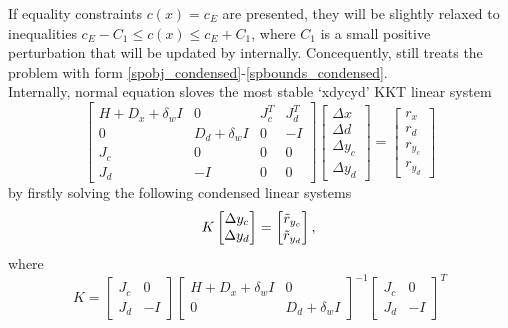  If equality constraints $c(x)=c_E$ are presented, they will be slightly relaxed to inequalities $c_E - C_1\leq c(x)\leq c_E+C_1$, where $C_1$ is a small positive perturbation that will be updated by \Hi internally. Concequently, \Hi still treats the problem with form \eqref{spobj_condensed}-\eqref{spbounds_condensed}.\\

Internally, normal equation sloves the most stable `xdycyd' KKT linear system 
\begin{equation} \label{KKT_xdycyd_normaleqn}
  \begin{bmatrix}
    H+D_x+\delta_{w}I & 0 & J_c^T & J_d^T\\
    0  & D_d + \delta_{w}I &  0    &  -I\\
    J_c & 0 & 0 & 0\\
    J_d & -I & 0 & 0
  \end{bmatrix}
  \begin{bmatrix} \Delta x \\ \Delta d \\ \Delta y_c \\ \Delta y_d  \end{bmatrix} = 
  \begin{bmatrix} r_x \\ r_d \\ r_{y_c} \\ r_{y_d}\end{bmatrix}
\end{equation}
by firstly solving the following condensed linear systems
\begin{equation} \label{KKT_normaleqn}
  K
  \begin{bmatrix} \Delta y_c \\ \Delta y_d  \end{bmatrix} 
  = 
  \begin{bmatrix} \tilde{r}_{y_c} \\ \tilde{r}_{y_d}\end{bmatrix}, \\
\end{equation}
where
\begin{equation} \label{KKT_normaleqn_mat}
  K = 
  \begin{bmatrix}
    J_c & 0 \\
    J_d & -I 
  \end{bmatrix}
  \begin{bmatrix}
    H+D_x+\delta_{w}I & 0 \\
    0  & D_d + \delta_{w}I
  \end{bmatrix}^{-1}
  \begin{bmatrix}
    J_c & 0 \\
    J_d & -I 
  \end{bmatrix}^T
\end{equation}
